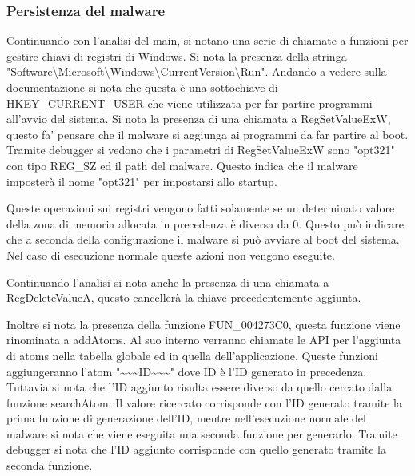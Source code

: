 \documentclass[a4paper,12pt]{article}
\begin{document}
\subsubsection{Persistenza del malware}
Continuando con l'analisi del main, si notano una serie di chiamate a funzioni per gestire chiavi di registri di Windows. Si nota la presenza della stringa "Software\textbackslash Microsoft\textbackslash Windows\textbackslash CurrentVersion\textbackslash Run". Andando a vedere sulla documentazione si nota che questa è una sottochiave di HKEY\_CURRENT\_USER che viene utilizzata per far partire programmi all'avvio del sistema. Si nota la presenza di una chiamata a RegSetValueExW, questo fa' pensare che il malware si aggiunga ai programmi da far partire al boot. Tramite debugger si vedono che i parametri di RegSetValueExW sono "opt321" con tipo REG\_SZ ed il path del malware. Questo indica che il malware imposterà il nome "opt321" per impostarsi allo startup.

Queste operazioni sui registri vengono fatti solamente se un determinato valore della zona di memoria allocata in precedenza è diversa da 0. Questo può indicare che a seconda della configurazione il malware si può avviare al boot del sistema. Nel caso di esecuzione normale queste azioni non vengono eseguite.

Continuando l'analisi si nota anche la presenza di una chiamata a RegDeleteValueA, questo cancellerà la chiave precedentemente aggiunta.

Inoltre si nota la presenza della funzione FUN\_004273C0, questa funzione viene rinominata a addAtoms. Al suo interno verranno chiamate le API per l'aggiunta di atoms nella tabella globale ed in quella dell'applicazione. Queste funzioni aggiungeranno l'atom "\textasciitilde\textasciitilde\textasciitilde ID\textasciitilde\textasciitilde\textasciitilde" dove ID è l'ID generato in precedenza. Tuttavia si nota che l'ID aggiunto risulta essere diverso da quello cercato dalla funzione searchAtom. Il valore ricercato corrisponde con l'ID generato tramite la prima funzione di generazione dell'ID, mentre nell'esecuzione normale del malware si nota che viene eseguita una seconda funzione per generarlo. Tramite debugger si nota che l'ID aggiunto corrisponde con quello generato tramite la seconda funzione.
\end{document}
